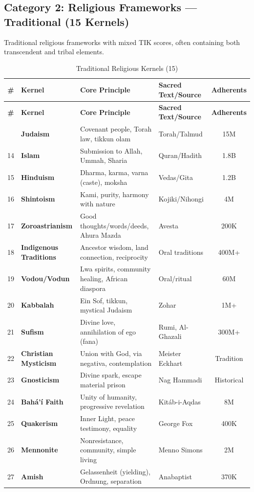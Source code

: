\documentclass[11pt,a4paper]{article}
\theoremstyle{definition}
\theoremstyle{remark}
\begin{document}
\subsection{Category 2: Religious Frameworks --- Traditional (15 Kernels)}

Traditional religious frameworks with mixed TIK scores, often containing both transcendent and tribal elements.

\begin{longtable}{@{}clp{4cm}p{3.5cm}c@{}}
\caption{Traditional Religious Kernels (15)} \label{tab:religious-kernels} \\
\toprule
\textbf{\#} & \textbf{Kernel} & \textbf{Core Principle} & \textbf{Sacred Text/Source} & \textbf{Adherents} \\
\midrule
\endfirsthead
\toprule
\textbf{\#} & \textbf{Kernel} & \textbf{Core Principle} & \textbf{Sacred Text/Source} & \textbf{Adherents} \\
\midrule
\endhead
\bottomrule
\endlastfoot
13 & \textbf{Judaism} & Covenant people, Torah law, tikkun olam & Torah/Talmud & 15M \\
14 & \textbf{Islam} & Submission to Allah, Ummah, Sharia & Quran/Hadith & 1.8B \\
15 & \textbf{Hinduism} & Dharma, karma, varna (caste), moksha & Vedas/Gita & 1.2B \\
16 & \textbf{Shintoism} & Kami, purity, harmony with nature & Kojiki/Nihongi & 4M \\
17 & \textbf{Zoroastrianism} & Good thoughts/words/deeds, Ahura Mazda & Avesta & 200K \\
18 & \textbf{Indigenous Traditions} & Ancestor wisdom, land connection, reciprocity & Oral traditions & 400M+ \\
19 & \textbf{Vodou/Vodun} & Lwa spirits, community healing, African diaspora & Oral/ritual & 60M \\
20 & \textbf{Kabbalah} & Ein Sof, tikkun, mystical Judaism & Zohar & 1M+ \\
21 & \textbf{Sufism} & Divine love, annihilation of ego (fana) & Rumi, Al-Ghazali & 300M+ \\
22 & \textbf{Christian Mysticism} & Union with God, via negativa, contemplation & Meister Eckhart & Tradition \\
23 & \textbf{Gnosticism} & Divine spark, escape material prison & Nag Hammadi & Historical \\
24 & \textbf{Bahá'í Faith} & Unity of humanity, progressive revelation & Kitáb-i-Aqdas & 8M \\
25 & \textbf{Quakerism} & Inner Light, peace testimony, equality & George Fox & 400K \\
26 & \textbf{Mennonite} & Nonresistance, community, simple living & Menno Simons & 2M \\
27 & \textbf{Amish} & Gelassenheit (yielding), Ordnung, separation & Anabaptist & 370K \\
\end{longtable}
\end{document}
